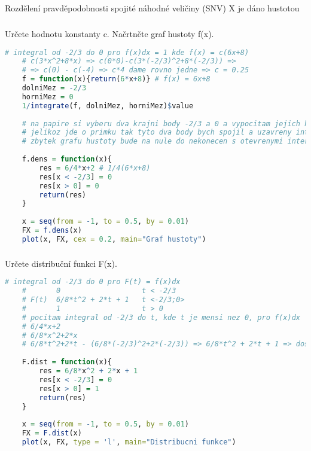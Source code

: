 \documentclass{article}%
\begin{document}
\newpage
\subsection{}
Rozdělení pravděpodobnosti spojité náhodné veličiny (SNV) X je dáno hustotou 

\subsubsection{}
Určete hodnotu konstanty c. Načrtněte graf hustoty f(x). 
\begin{lstlisting}[language=R, showstringspaces=false, basicstyle=\small]
    # integral od -2/3 do 0 pro f(x)dx = 1 kde f(x) = c(6x+8)
    # c(3*x^2+8*x) => c(0*0)-c(3*(-2/3)^2+8*(-2/3)) => 
    # => c(0) - c(-4) => c*4 dame rovno jedne => c = 0.25
    f = function(x){return(6*x+8)} # f(x) = 6x+8
    dolniMez = -2/3
    horniMez = 0
    1/integrate(f, dolniMez, horniMez)$value
    
    # na papire si vyberu dva krajni body -2/3 a 0 a vypocitam jejich hodnoty
    # jelikoz jde o primku tak tyto dva body bych spojil a uzavreny interval
    # zbytek grafu hustoty bude na nule do nekonecen s otevrenymi intervaly
    
    f.dens = function(x){
        res = 6/4*x+2 # 1/4(6*x+8)
        res[x < -2/3] = 0 
        res[x > 0] = 0  
        return(res)
    }
    
    x = seq(from = -1, to = 0.5, by = 0.01) 
    FX = f.dens(x) 
    plot(x, FX, cex = 0.2, main="Graf hustoty")     
\end{lstlisting}

\subsubsection{}
Určete distribuční funkci F(x). 
\begin{lstlisting}[language=R, showstringspaces=false, basicstyle=\small]
    # integral od -2/3 do 0 pro F(t) = f(x)dx
    #       0                   t < -2/3
    # F(t)  6/8*t^2 + 2*t + 1   t <-2/3;0>
    #       1                   t > 0
    # pocitam integral od -2/3 do t, kde t je mensi nez 0, pro f(x)dx
    # 6/4*x+2
    # 6/8*x^2+2*x
    # 6/8*t^2+2*t - (6/8*(-2/3)^2+2*(-2/3)) => 6/8*t^2 + 2*t + 1 => dosadim do F(t)
    
    F.dist = function(x){
        res = 6/8*x^2 + 2*x + 1
        res[x < -2/3] = 0 
        res[x > 0] = 1  
        return(res)
    }
    
    x = seq(from = -1, to = 0.5, by = 0.01) 
    FX = F.dist(x)
    plot(x, FX, type = 'l', main="Distribucni funkce")
\end{lstlisting}
\end{document}
